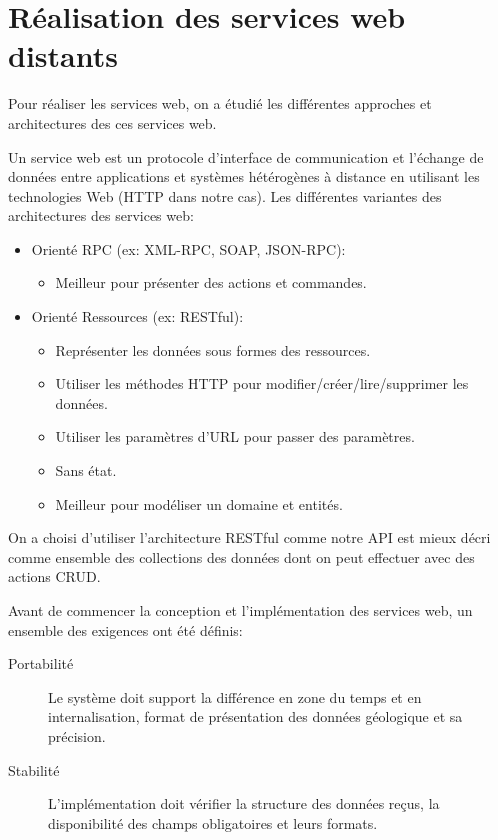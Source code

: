 \section{Réalisation des services web distants}

Pour réaliser les services web, on a étudié les différentes approches et
architectures des ces services web.

Un service web est un protocole d'interface de communication et l'échange de
données entre applications et systèmes hétérogènes à distance en utilisant les
technologies Web (HTTP dans notre cas). Les différentes variantes des
architectures des services web:

\begin{itemize}
    \item Orienté RPC (ex: XML-RPC, SOAP, JSON-RPC):
        \begin{itemize}
            \item Meilleur pour présenter des actions et commandes.
        \end{itemize}
    \item Orienté Ressources (ex: RESTful):
        \begin{itemize}
            \item Représenter les données sous formes des ressources.
            \item Utiliser les méthodes HTTP pour modifier/créer/lire/supprimer
                les données.
            \item Utiliser les paramètres d'URL pour passer des paramètres.
            \item Sans état.
            \item Meilleur pour modéliser un domaine et entités.
        \end{itemize}
\end{itemize}

On a choisi d'utiliser l'architecture RESTful comme notre API est mieux décri
comme ensemble des collections des données dont on peut effectuer avec des
actions CRUD\@.

Avant de commencer la conception et l'implémentation des services web, un
ensemble des exigences ont été définis:

\begin{description}
    \item [Portabilité] Le système doit support la différence en zone du temps
        et en internalisation, format de présentation des données géologique et
        sa précision.
    \item [Stabilité] L'implémentation doit vérifier la structure des données
        reçus, la disponibilité des champs obligatoires et leurs formats.
\end{description}


